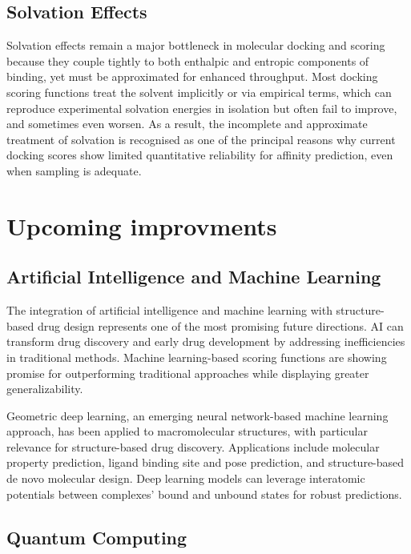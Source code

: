 \documentclass[12pt]{article}
\begin{document}
\subsection{Solvation Effects}

Solvation effects remain a major bottleneck in molecular docking and scoring because they couple tightly to both enthalpic and entropic components of binding, yet must be approximated for enhanced throughput.  Most docking scoring functions treat the solvent implicitly or via empirical terms, which can reproduce experimental solvation energies in isolation but often fail to improve, and sometimes even worsen.  As a result, the incomplete and approximate treatment of solvation is recognised as one of the principal reasons why current docking scores show limited quantitative reliability for affinity prediction, even when sampling is adequate\cite{CH1_24}.



\section{Upcoming improvments}

\subsection{Artificial Intelligence and Machine Learning}

The integration of artificial intelligence and machine learning with structure-based drug design represents one of the most promising future directions. AI can transform drug discovery and early drug development by addressing inefficiencies in traditional methods. Machine learning-based scoring functions are showing promise for outperforming traditional approaches while displaying greater generalizability.

Geometric deep learning, an emerging neural network-based machine learning approach, has been applied to macromolecular structures, with particular relevance for structure-based drug discovery. Applications include molecular property prediction, ligand binding site and pose prediction, and structure-based de novo molecular design. Deep learning models can leverage interatomic potentials between complexes’ bound and unbound states for robust predictions.



\subsection{Quantum Computing}
\end{document}
